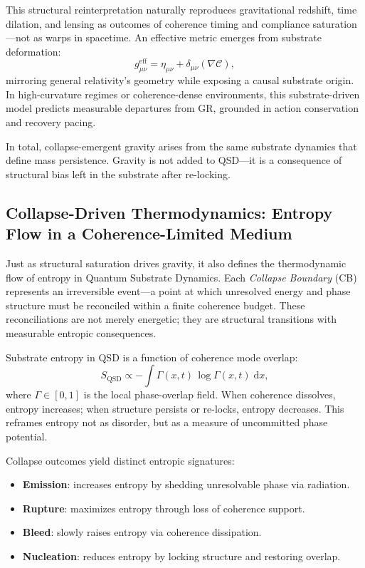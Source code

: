 \documentclass[preprints,article,submit,pdftex,moreauthors]{Definitions/mdpi}
\begin{document}
This structural reinterpretation naturally reproduces gravitational redshift, time dilation, and lensing as outcomes of coherence timing and compliance saturation—not as warps in spacetime. An effective metric emerges from substrate deformation:
\[
g_{\mu\nu}^{\mathrm{eff}} = \eta_{\mu\nu} + \delta_{\mu\nu}(\nabla \mathcal{C}),
\]
mirroring general relativity's geometry while exposing a causal substrate origin. In high-curvature regimes or coherence-dense environments, this substrate-driven model predicts measurable departures from GR, grounded in action conservation and recovery pacing.

In total, collapse-emergent gravity arises from the same substrate dynamics that define mass persistence. Gravity is not added to QSD—it is a consequence of structural bias left in the substrate after re-locking.

\subsection{Collapse-Driven Thermodynamics: Entropy Flow in a Coherence-Limited Medium}

Just as structural saturation drives gravity, it also defines the thermodynamic flow of entropy in Quantum Substrate Dynamics. Each \emph{Collapse Boundary} (CB) represents an irreversible event—a point at which unresolved energy and phase structure must be reconciled within a finite coherence budget. These reconciliations are not merely energetic; they are structural transitions with measurable entropic consequences.

Substrate entropy in QSD is a function of coherence mode overlap:
\begin{equation}
S_{\mathrm{QSD}} \propto - \int \Gamma(x,t)\, \log \Gamma(x,t) \;\mathrm{d}x,
\end{equation}
where \( \Gamma \in [0,1] \) is the local phase-overlap field. When coherence dissolves, entropy increases; when structure persists or re-locks, entropy decreases. This reframes entropy not as disorder, but as a measure of uncommitted phase potential.

Collapse outcomes yield distinct entropic signatures:
\begin{itemize}
    \item \textbf{Emission}: increases entropy by shedding unresolvable phase via radiation.
    \item \textbf{Rupture}: maximizes entropy through loss of coherence support.
    \item \textbf{Bleed}: slowly raises entropy via coherence dissipation.
    \item \textbf{Nucleation}: reduces entropy by locking structure and restoring overlap.
\end{itemize}
\end{document}
